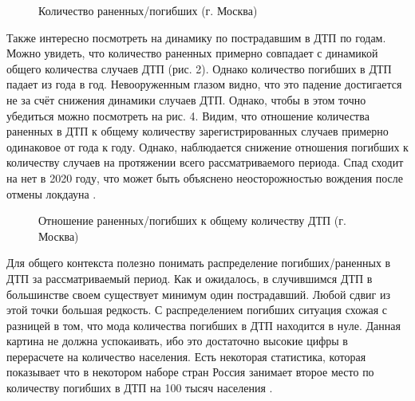 \documentclass[a4paper, 14pt]{article}
\begin{document}
\begin{figure}[h]
	\caption{Количество раненных/погибших (г. Москва)}
\end{figure}

Также интересно посмотреть на динамику по пострадавшим в ДТП по годам. Можно увидеть, что количество раненных примерно совпадает с динамикой общего количества случаев ДТП (рис. 2). Однако количество погибших в ДТП падает из года в год. Невооруженным глазом видно, что это падение достигается не за счёт снижения динамики случаев ДТП. Однако, чтобы в этом точно убедиться можно посмотреть на рис. 4. Видим, что отношение количества раненных в ДТП к общему количеству зарегистрированных случаев примерно одинаковое от года к году. Однако, наблюдается снижение отношения погибших к количеству случаев на протяжении всего рассматриваемого периода.  Спад сходит на нет в 2020 году, что может быть объяснено неосторожностью вождения после отмены локдауна \cite{rbkNews}. 

\begin{figure}[h]
	\caption{Отношение раненных/погибших к общему количеству ДТП (г. Москва)}
\end{figure}


Для общего контекста полезно понимать распределение погибших/раненных в ДТП за рассматриваемый период. Как и ожидалось, в случившимся ДТП в большинстве своем существует минимум один пострадавший. Любой сдвиг из этой точки большая редкость. С распределением погибших ситуация схожая с разницей в том, что мода количества погибших в ДТП находится в нуле. Данная картина не должна успокаивать, ибо это достаточно высокие цифры в перерасчете на количество населения. Есть некоторая статистика, которая показывает что в некотором наборе стран Россия занимает второе место по количеству погибших в ДТП на 100 тысяч населения \cite{tass_rating}. 
\end{document}
